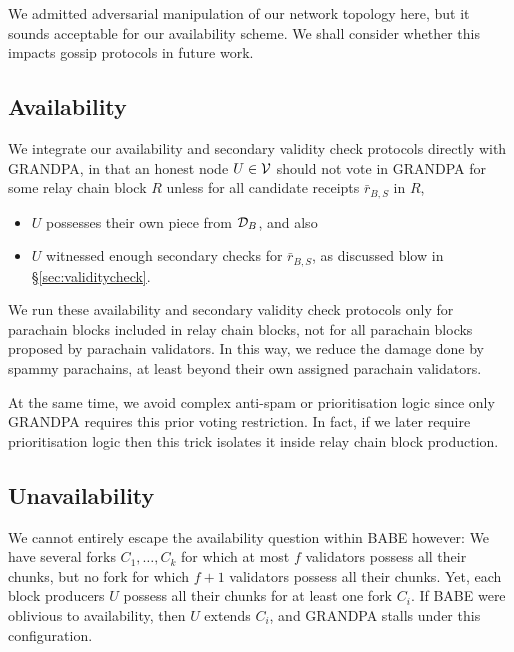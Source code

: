 We admitted adversarial manipulation of our network topology here, but it sounds acceptable for our availability scheme.  We shall consider whether this impacts gossip protocols in future work. 


\subsection{Availability} %
\label{sec:availability}

We integrate our availability and secondary validity check protocols directly with GRANDPA, in that an honest node $U \in \mathcal{V}$ should not vote in GRANDPA for some relay chain block $R$ unless for all candidate receipts $\bar{r}_{B,S}$ in $R$,
\begin{itemize}
\item $U$ possesses their own piece from $\mathcal{D}_B$, and also
\item $U$ witnessed enough secondary checks for $\bar{r}_{B,S}$,
 as discussed blow in \S\ref{sec:validitycheck}.
\end{itemize}

We run these availability and secondary validity check protocols only for parachain blocks included in relay chain blocks, not for all parachain blocks proposed by parachain validators.  In this way, we reduce the damage done by spammy parachains, at least beyond their own assigned parachain validators.

At the same time, we avoid complex anti-spam or prioritisation logic since only GRANDPA requires this prior voting restriction.  In fact, if we later require prioritisation logic then this trick isolates it inside relay chain block production.


\subsection{Unavailability} %
\label{sec:unavailability}

We cannot entirely escape the availability question within BABE however:  We have several forks $C_1,\ldots,C_k$ for which at most $f$ validators possess all their chunks, but no fork for which $f+1$ validators possess all their chunks.  Yet, each block producers $U$ possess all their chunks for at least one fork $C_i$.  If BABE were oblivious to availability, then $U$ extends $C_i$, and GRANDPA stalls under this configuration. 

